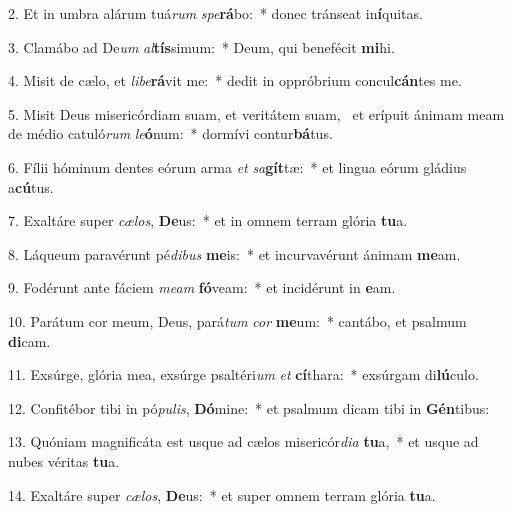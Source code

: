2. Et in umbra alárum tuá\textit{rum} \textit{spe}\textbf{rá}bo:~*  donec tránseat in\textbf{í}quitas.\

3. Clamábo ad De\textit{um} \textit{al}\textbf{tís}simum:~*  Deum, qui benefécit \textbf{mi}hi.\

4. Misit de cælo, et \textit{li}\textit{be}\textbf{rá}vit me:~*  dedit in oppróbrium concul\textbf{cán}tes me.\

5. Misit Deus misericórdiam suam, et veritátem suam, \dag\  et erípuit ánimam meam de médio catuló\textit{rum} \textit{le}\textbf{ó}num:~*  dormívi contur\textbf{bá}tus.\

6. Fílii hóminum dentes eórum arma \textit{et} \textit{sa}\textbf{gít}tæ:~*  et lingua eórum gládius a\textbf{cú}tus.\

7. Exaltáre super \textit{cæ}\textit{los}, \textbf{De}us:~*  et in omnem terram glória \textbf{tu}a.\

8. Láqueum paravérunt pé\textit{di}\textit{bus} \textbf{me}is:~*  et incurvavérunt ánimam \textbf{me}am.\

9. Fodérunt ante fáciem \textit{me}\textit{am} \textbf{fó}veam:~*  et incidérunt in \textbf{e}am.\

10. Parátum cor meum, Deus, pará\textit{tum} \textit{cor} \textbf{me}um:~*  cantábo, et psalmum \textbf{di}cam.\

11. Exsúrge, glória mea, exsúrge psaltéri\textit{um} \textit{et} \textbf{cí}thara:~*  exsúrgam di\textbf{lú}culo.\

12. Confitébor tibi in pó\textit{pu}\textit{lis}, \textbf{Dó}mine:~*  et psalmum dicam tibi in \textbf{Gén}tibus:\

13. Quóniam magnificáta est usque ad cælos misericór\textit{di}\textit{a} \textbf{tu}a,~*  et usque ad nubes véritas \textbf{tu}a.\

14. Exaltáre super \textit{cæ}\textit{los}, \textbf{De}us:~*  et super omnem terram glória \textbf{tu}a.\

